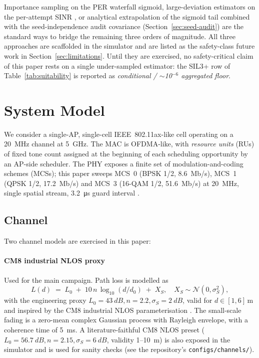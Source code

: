 \documentclass[journal,onecolumn,11pt,a4paper]{IEEEtran}
\begin{document}
Importance sampling on the PER waterfall sigmoid, large-deviation
estimators on the per-attempt SINR \cite{TGax571,Iyy22}, or
analytical extrapolation of the sigmoid tail combined with the
seed-independence audit covariance (Section~\ref{sec:seed-audit})
are the standard ways to bridge the remaining
three orders of magnitude. All three approaches are scaffolded in
the simulator and are listed as the safety-class future work in
Section~\ref{sec:limitations}. Until they are exercised, no
safety-critical claim of this paper rests on a single
under-sampled estimator: the SIL3+ row of
Table~\ref{tab:suitability} is reported as
\emph{conditional / $\sim$10$^{-6}$ aggregated floor}.

\section{System Model}
\label{sec:sysmodel}

We consider a single-AP, single-cell IEEE~802.11ax-like cell operating
on a \SI{20}{MHz} channel at \SI{5}{GHz}. The MAC is OFDMA-like, with
\emph{resource units} (RUs) of fixed tone count assigned at the
beginning of each scheduling opportunity by an AP-side scheduler. The
PHY exposes a finite set of modulation-and-coding schemes (MCSs); this
paper sweeps MCS~0 (BPSK 1/2, \SI{8.6}{Mb/s}), MCS~1 (QPSK 1/2,
\SI{17.2}{Mb/s}) and MCS~3 (16-QAM 1/2, \SI{51.6}{Mb/s}) at
\SI{20}{MHz}, single spatial stream, \SI{3.2}{\micro\second} guard
interval \cite{Kho19}.

\subsection{Channel}
\label{sec:channel}

Two channel models are exercised in this paper:

\paragraph{CM8 industrial NLOS proxy} Used for the main campaign. Path
loss is modelled as
\begin{equation}
  L(d) \;=\; L_0 \;+\; 10\,n\,\log_{10}(d/d_0) \;+\; X_S,
  \quad X_S \sim \mathcal{N}(0,\sigma_S^2),
  \label{eq:pl-cm8}
\end{equation}
with the engineering proxy
$L_0 = \SI{43}{dB}, n = 2.2, \sigma_S = \SI{2}{dB}$, valid for
$d \in [1,6]\,\mathrm{m}$ and inspired by the CM8 industrial NLOS
parameterisation \cite{Mol09,Mol04}. The small-scale fading is a
zero-mean complex Gaussian process with Rayleigh envelope, with a
coherence time of \SI{5}{ms}. A literature-faithful CM8 NLOS preset
($L_0 = \SI{56.7}{dB}, n = 2.15, \sigma_S = \SI{6}{dB}$, validity
1--\SI{10}{m}) is also exposed in the simulator and is used for
sanity checks (see the repository's \texttt{configs/channels/}).
\end{document}
